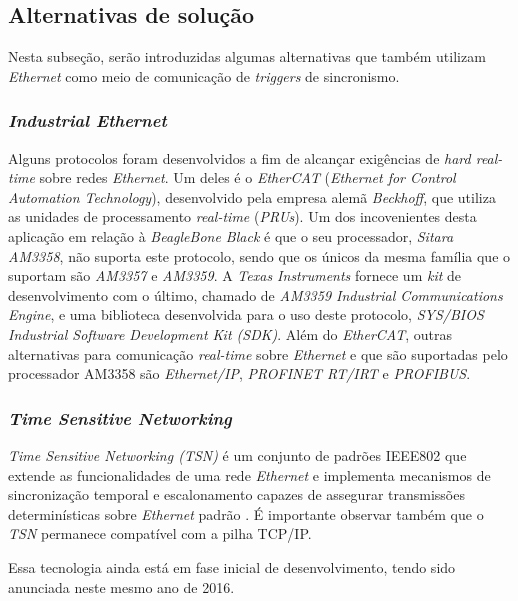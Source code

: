 \subsection{Alternativas de solução}

Nesta subseção, serão introduzidas algumas alternativas que também utilizam
\textit{Ethernet} como meio de comunicação de \textit{triggers} de sincronismo.

\subsubsection{\textit{Industrial Ethernet}}

Alguns protocolos foram desenvolvidos a fim de alcançar exigências de
\textit{hard real-time} sobre redes \textit{Ethernet}. Um deles é o
\textit{EtherCAT} (\textit{Ethernet for Control Automation Technology}),
desenvolvido pela empresa alemã \textit{Beckhoff}, que utiliza as unidades de
processamento \textit{real-time} (\textit{PRUs}). Um dos incovenientes desta
aplicação em relação à \textit{BeagleBone Black} é que o seu processador,
\textit{Sitara AM3358}, não suporta este protocolo, sendo que os únicos da mesma
família que o suportam são \textit{AM3357} e \textit{AM3359}. A \textit{Texas
Instruments} fornece um \textit{kit} de desenvolvimento com o último, chamado de
\textit{AM3359 Industrial Communications Engine}, e uma biblioteca desenvolvida
para o uso deste protocolo, \textit{SYS/BIOS Industrial Software Development Kit
(SDK)}. Além do \textit{EtherCAT}, outras alternativas para comunicação
\textit{real-time} sobre \textit{Ethernet} e que são suportadas pelo processador
AM3358 são \textit{Ethernet/IP}, \textit{PROFINET RT/IRT} e \textit{PROFIBUS}.

\subsubsection{\textit{Time Sensitive Networking}}

\textit{Time Sensitive Networking (TSN)} é um conjunto de padrões IEEE802 que
extende as funcionalidades de uma rede \textit{Ethernet} e
implementa mecanismos de sincronização temporal e escalonamento capazes de
assegurar transmissões determinísticas sobre \textit{Ethernet}
padrão \cite{marcio}. É importante observar também que o \textit{TSN}
permanece compatível com a pilha TCP/IP.

\vspace{12pt}

Essa tecnologia ainda está em fase inicial de desenvolvimento, tendo sido
anunciada neste mesmo ano de 2016.


